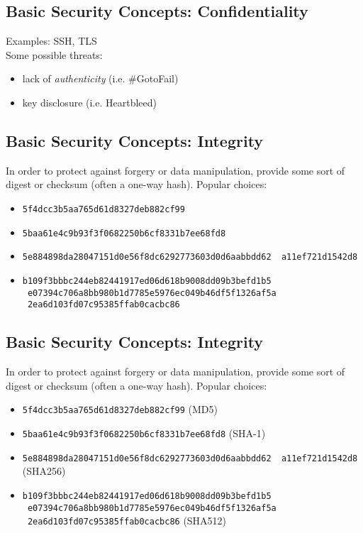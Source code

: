 \documentclass[xga]{xdvislides}
\begin{document}
\subsection{Basic Security Concepts: Confidentiality}
Examples: SSH, TLS \\

\vspace{.5in}
Some possible threats:
\begin{itemize}
	\item lack of {\em authenticity} (i.e. \#GotoFail)
	\item key disclosure (i.e. Heartbleed)
\end{itemize}

\subsection{Basic Security Concepts: Integrity}
In order to protect against forgery or data manipulation, provide some sort of
digest or checksum (often a one-way hash).  Popular choices:

\begin{itemize}
	\item {\tt 5f4dcc3b5aa765d61d8327deb882cf99}
	\item {\tt 5baa61e4c9b93f3f0682250b6cf8331b7ee68fd8}
	\item {\tt 5e884898da28047151d0e56f8dc6292773603d0d6aabbdd62 \
                   a11ef721d1542d8}
	\item {\tt b109f3bbbc244eb82441917ed06d618b9008dd09b3befd1b5 \
                   e07394c706a8bb980b1d7785e5976ec049b46df5f1326af5a \
                   2ea6d103fd07c95385ffab0cacbc86}
\end{itemize}

\subsection{Basic Security Concepts: Integrity}
In order to protect against forgery or data manipulation, provide some sort of
digest or checksum (often a one-way hash).  Popular choices:

\begin{itemize}
	\item {\tt 5f4dcc3b5aa765d61d8327deb882cf99} (MD5)
	\item {\tt 5baa61e4c9b93f3f0682250b6cf8331b7ee68fd8} (SHA-1)
	\item {\tt 5e884898da28047151d0e56f8dc6292773603d0d6aabbdd62 \
                   a11ef721d1542d8} (SHA256)
	\item {\tt b109f3bbbc244eb82441917ed06d618b9008dd09b3befd1b5 \
                   e07394c706a8bb980b1d7785e5976ec049b46df5f1326af5a \
                   2ea6d103fd07c95385ffab0cacbc86} (SHA512)
\end{itemize}
\end{document}
